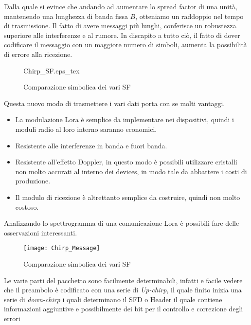 Dalla quale si evince che andando ad aumentare lo spread factor di una unità,
mantenendo una lunghezza di banda fissa $B$, otteniamo un raddoppio nel tempo di
trasmissione. Il fatto di avere messaggi più lunghi, conferisce un robustezza
superiore alle interferenze e al rumore. In discapito a tutto ciò, il fatto di
dover codificare il messaggio con un maggiore numero di simboli, aumenta la
possibilità di errore alla ricezione. 

\begin{figure}[h]
\centering 
{Chirp_SF.eps_tex}
\caption{Comparazione simbolica dei vari SF}
\end{figure}

Questa nuovo modo di trasmettere i vari dati porta con se molti vantaggi.
\begin{itemize}
\item La modulazione Lora è semplice da implementare nei dispositivi, quindi i
moduli radio al loro interno saranno economici.
\item Resistente alle interferenze in banda e fuori banda.
\item Resistente  all'effetto Doppler, in questo modo è possibili utilizzare
cristalli non molto accurati al interno dei devices, in modo tale da abbattere i
costi di produzione.
\item Il modulo di ricezione è altrettanto semplice da costruire, quindi non
molto costoso.
\end{itemize}

Analizzando lo spettrogramma di una comunicazione Lora è possibili fare delle
osservazioni interessanti. 

\begin{figure}[h]
\centering 
\texttt{[image: Chirp\_Message]}
\caption{Comparazione simbolica dei vari SF}
\end{figure}

Le varie parti del pacchetto  sono facilmente determinabili, infatti e facile
vedere che il preambolo è codificato con una serie di \emph{Up-chirp}, il quale
finito inizia una serie di \emph{down-chirp} i quali determinano il SFD o Header
il quale contiene informazioni aggiuntive e possibilmente dei bit per il
controllo e correzione degli errori
